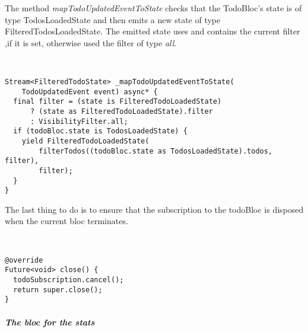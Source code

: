 The method \textit{mapTodoUpdatedEventToState} checks that the TodoBloc’s state is of type TodosLoadedState and then emits a new state of type FilteredTodosLoadedState. The emitted state uses and contains the current filter ,if it is set, otherwise used the filter of type \textit{all}.
\begin{code}
\mbox{}\\
 \mbox{}
\label{code:2.14}
\begin{verbatim}
Stream<FilteredTodoState> _mapTodoUpdatedEventToState(
    TodoUpdatedEvent event) async* {
  final filter = (state is FilteredTodoLoadedState)
      ? (state as FilteredTodoLoadedState).filter
      : VisibilityFilter.all;
  if (todoBloc.state is TodosLoadedState) {
    yield FilteredTodoLoadedState(
        filterTodos((todoBloc.state as TodosLoadedState).todos, filter),
        filter);
  }
}
\end{verbatim}
\mbox{}
\end{code}

The last thing to do is to ensure that the subscription to the todoBloc is disposed when the current bloc terminates.
\begin{code}
\mbox{}\\
 \mbox{}
\label{code:2.14}
\begin{verbatim}
@override
Future<void> close() {
  todoSubscription.cancel();
  return super.close();
}
\end{verbatim}
\mbox{}
\end{code}


\subparagraph{The bloc for the stats}\mbox{}\\
\label{subpar:todo_app_bloc_core_state}

